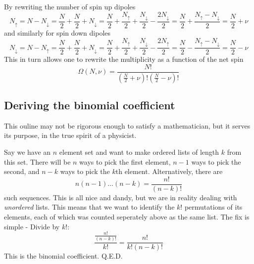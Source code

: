 \documentclass[10pt,a4paper]{amsart}
\begin{document}
By rewriting the number of spin up dipoles
\begin{equation}
N_{\uparrow}=N-N_{\downarrow}=\frac{N}{2}+\frac{N}{2}+N_{\downarrow}
=\frac{N}{2}+\frac{N_{\uparrow}}{2}+\frac{N_{\downarrow}}{2}-\frac{2N_{\downarrow}}{2}=\frac{N}{2}+\frac{N_{\uparrow}-N_{\downarrow}}{2}=\frac{N}{2}+\nu
\end{equation}
and similarly for spin down dipoles
\begin{equation}
N_{\downarrow}=N-N_{\uparrow}=\frac{N}{2}+\frac{N}{2}+N_{\downarrow}
=\frac{N}{2}+\frac{N_{\uparrow}}{2}+\frac{N_{\downarrow}}{2}-\frac{2N_{\uparrow}}{2}=\frac{N}{2}-\frac{N_{\uparrow}-N_{\downarrow}}{2}=\frac{N}{2}-\nu
\end{equation}
This in turn allows one to rewrite the multiplicity as a function of the net spin
\begin{equation}
\Omega (N,\nu) = \frac{N!}{\left(\frac{N}{2} +\nu\right)!\left(\frac{N}{2} -\nu\right)!}
\end{equation}

\begin{appendices}
\section{Deriving the binomial coefficient}
\label{app:binom}
This ouline may not be rigorous enough to satisfy a mathematician, but it serves its purpose, in the true spirit of a physicist.

Say we have an $n$ element set and want to make ordered lists of length $k$ from this set. There will be $n$ ways to pick the first element, $n-1$ ways to pick the second, and $n-k$ ways to pick the $k$th element. Alternatively, there are
\begin{equation}
n(n-1)\dots(n-k)=\frac{n!}{(n-k)!}
\end{equation}
such sequences.
This is all nice and dandy, but we are in reality dealing with \emph{unordered} lists. This means that we want to identify the $k!$ permutations of its elements, each of which was counted seperately above as the same list. The fix is simple - Divide by $k!$:
\begin{equation}
\frac{\frac{n!}{(n-k)!}}{k!}=\frac{n!}{k!(n-k)!}
\end{equation}
This is the binomial coefficient. Q.E.D.
\end{appendices}
\end{document}
